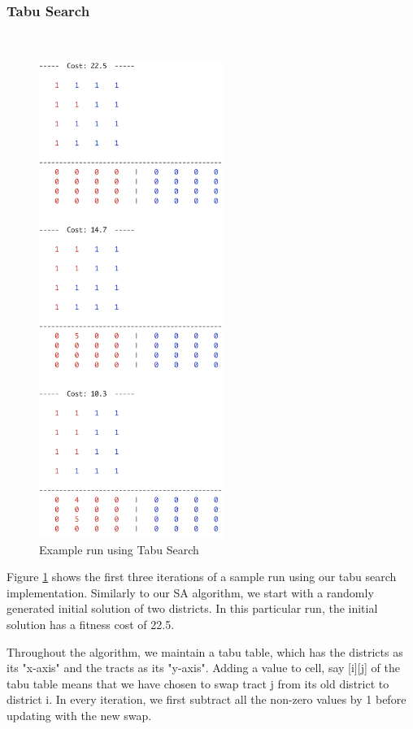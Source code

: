 \documentclass[journal]{IEEEtran}
\begin{document}
\subsubsection{Tabu Search}~\\
\begin{figure}[h!]
    \includegraphics[width=6cm]{tabu.png}
    \centering
    \caption{Example run using Tabu Search}
        \label{fig:tabu_example}
\end{figure}
Figure \ref{fig:tabu_example} shows the first three iterations of a sample run using our tabu search implementation. Similarly to our SA algorithm, we start with a randomly generated initial solution of two districts. In this particular run, the initial solution has a fitness cost of 22.5.

Throughout the algorithm, we maintain a tabu table, which has the districts as its "x-axis" and the tracts as its "y-axis". Adding a value to cell, say [i][j] of the tabu table means that we have chosen to swap tract j from its old district to district i. In every iteration, we first subtract all the non-zero values by 1 before updating with the new swap. 
\end{document}
